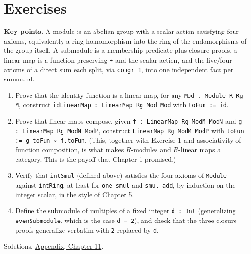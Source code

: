 \section{Exercises}\label{sec:11-modules:07-exercises:1}

\textbf{Key points.} A module is an abelian group with a scalar action satisfying four axioms, equivalently a ring homomorphism into the ring of the endomorphisms of the group itself. A submodule is a membership predicate plus closure proofs, a linear map is a function preserving \texttt{+} and the scalar action, and the five/four axioms of a direct sum each split, via \texttt{congr 1}, into one independent fact per summand.

\begin{enumerate}
\def\labelenumi{\arabic{enumi}.}
\tightlist
\item
  Prove that the identity function is a linear map, for any \texttt{Mod : Module R Rg M}, construct \texttt{idLinearMap : LinearMap Rg Mod Mod} with \texttt{toFun := id}.
\item
  Prove that linear maps compose, given \texttt{f : LinearMap Rg ModM ModN} and \texttt{g : LinearMap Rg ModN ModP}, construct \texttt{LinearMap Rg ModM ModP} with \texttt{toFun := g.toFun ∘ f.toFun}. (This, together with Exercise 1 and associativity of function composition, is what makes \(R\)-modules and \(R\)-linear maps a category. This is the payoff that Chapter 1 promised.)
\item
  Verify that \texttt{intSmul} (defined above) satisfies the four axioms of \texttt{Module} against \texttt{intRing}, at least for \texttt{one\_\allowbreak{}smul} and \texttt{smul\_\allowbreak{}add}, by induction on the integer scalar, in the style of Chapter 5.
\item
  Define the submodule of multiples of a fixed integer \texttt{d : Int} (generalizing \texttt{evenSubmodule}, which is the case \texttt{d = 2}), and check that the three closure proofs generalize verbatim with \texttt{2} replaced by \texttt{d}.
\end{enumerate}

Solutions, \hyperref[sec:15-appendix-solutions:11-chapter-11:1]{Appendix, Chapter 11}.

